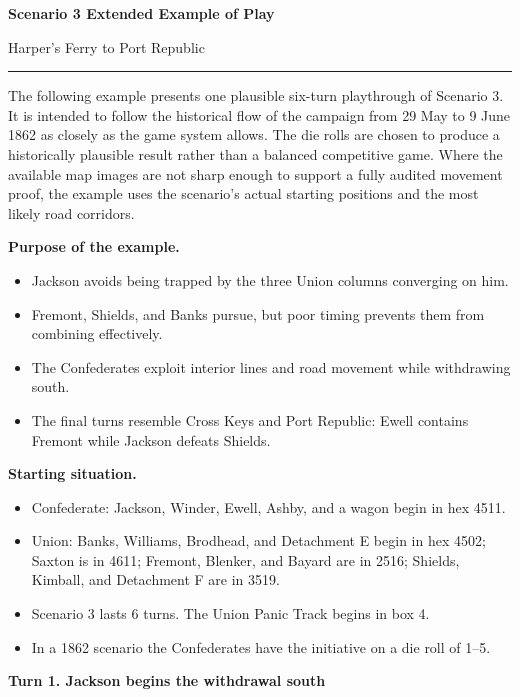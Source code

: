 \documentclass[11pt]{article}
\begin{document}
{\LARGE\bfseries Scenario 3 Extended Example of Play\par}
{\large Harper's Ferry to Port Republic\par}
\vspace{0.25em}
\color{titleline}\rule{\textwidth}{1.2pt}\par
\vspace{0.45em}

The following example presents one plausible six-turn playthrough of Scenario 3. It is intended to follow the historical flow of the campaign from 29 May to 9 June 1862 as closely as the game system allows. The die rolls are chosen to produce a historically plausible result rather than a balanced competitive game. Where the available map images are not sharp enough to support a fully audited movement proof, the example uses the scenario's actual starting positions and the most likely road corridors.

\textbf{Purpose of the example.}

\begin{itemize}
\item Jackson avoids being trapped by the three Union columns converging on him.
\item Fremont, Shields, and Banks pursue, but poor timing prevents them from combining effectively.
\item The Confederates exploit interior lines and road movement while withdrawing south.
\item The final turns resemble Cross Keys and Port Republic: Ewell contains Fremont while Jackson defeats Shields.
\end{itemize}

\textbf{Starting situation.}

\begin{itemize}
\item Confederate: Jackson, Winder, Ewell, Ashby, and a wagon begin in hex 4511.
\item Union: Banks, Williams, Brodhead, and Detachment E begin in hex 4502; Saxton is in 4611; Fremont, Blenker, and Bayard are in 2516; Shields, Kimball, and Detachment F are in 3519.
\item Scenario 3 lasts 6 turns. The Union Panic Track begins in box 4.
\item In a 1862 scenario the Confederates have the initiative on a die roll of 1--5.
\end{itemize}

\textbf{Turn 1. Jackson begins the withdrawal south}
\end{document}
